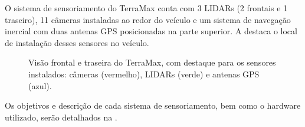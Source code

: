 O sistema de sensoriamento do TerraMax conta com 3 LIDARs (2 frontais e 1 traseiro), 11 câmeras instaladas ao redor do veículo e um sistema de navegação inercial com duas antenas GPS posicionadas na parte superior. A  destaca o local de instalação desses sensores no veículo.

\begin{figure}[h]
\centering
{}\enskip
{}
\caption{Visão frontal e traseira do TerraMax, com destaque para os sensores instalados: câmeras (vermelho), LIDARs (verde) e antenas GPS (azul).}%
\label{fig:sensores}%
\end{figure}

Os objetivos e descrição de cada sistema de sensoriamento, bem como o hardware utilizado, serão detalhados na .


